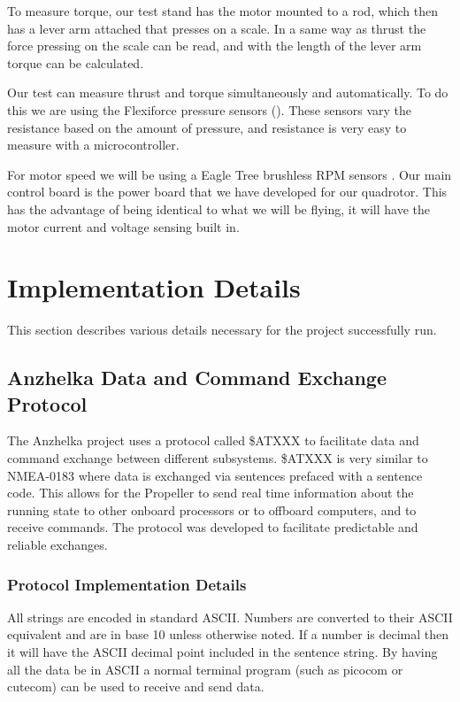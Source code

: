 \documentclass{article}
\numberwithin{equation}{section} %
\begin{document}
To measure torque, our test stand has the motor mounted to a rod, which then has a lever arm attached that presses on a scale. In a same way as thrust the force pressing on the scale can be read, and with the length of the lever arm torque can be calculated.

Our test can measure thrust and torque simultaneously and automatically. To do this we are using the Flexiforce pressure sensors (\cite{tekscanforce}). These sensors vary the resistance based on the amount of pressure, and resistance is very easy to measure with a microcontroller.

For motor speed we will be using a Eagle Tree brushless RPM sensors \cite{eaglerpm}. Our main control board is the power board that we have developed for our quadrotor. This has the advantage of being identical to what we will be flying, it will have the motor current and voltage sensing built in.



\section{Implementation Details}
This section describes various details necessary for the project successfully run.

\subsection{Anzhelka Data and Command Exchange Protocol}

The Anzhelka project uses a protocol called \$ATXXX to facilitate data and command exchange between different subsystems. \$ATXXX is very similar to NMEA-0183 where data is exchanged via sentences prefaced with a sentence code. This allows for the Propeller to send real time information about the running state to other onboard processors or to offboard computers, and to receive commands. The protocol was developed to facilitate predictable and reliable exchanges.

\subsubsection{Protocol Implementation Details}
All strings are encoded in standard ASCII. Numbers are converted to their ASCII equivalent and are in base 10 unless otherwise noted. If a number is decimal then it will have the ASCII decimal point included in the sentence string. By having all the data be in ASCII a normal terminal program (such as picocom or cutecom) can be used to receive and send data. 
\end{document}
